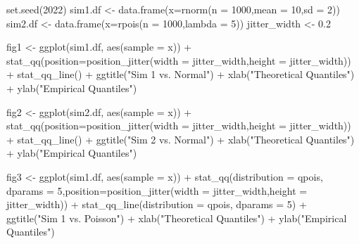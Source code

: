 \documentclass[
  11pt,
]{book}
\newenvironment{Shaded}{\begin{snugshade}}{\end{snugshade}}
\newcommand{\AttributeTok}[1]{\textcolor[rgb]{0.77,0.63,0.00}{#1}}
\newcommand{\DecValTok}[1]{\textcolor[rgb]{0.00,0.00,0.81}{#1}}
\newcommand{\FloatTok}[1]{\textcolor[rgb]{0.00,0.00,0.81}{#1}}
\newcommand{\FunctionTok}[1]{\textcolor[rgb]{0.00,0.00,0.00}{#1}}
\newcommand{\NormalTok}[1]{#1}
\newcommand{\OtherTok}[1]{\textcolor[rgb]{0.56,0.35,0.01}{#1}}
\newcommand{\SpecialCharTok}[1]{\textcolor[rgb]{0.00,0.00,0.00}{#1}}
\newcommand{\StringTok}[1]{\textcolor[rgb]{0.31,0.60,0.02}{#1}}
\theoremstyle{definition}
\theoremstyle{definition}
\theoremstyle{definition}
\theoremstyle{definition}
\theoremstyle{remark}
\begin{document}
\begin{Shaded}
\begin{Highlighting}[]
\FunctionTok{set.seed}\NormalTok{(}\DecValTok{2022}\NormalTok{)}
\NormalTok{sim1.df }\OtherTok{\textless{}{-}} \FunctionTok{data.frame}\NormalTok{(}\AttributeTok{x=}\FunctionTok{rnorm}\NormalTok{(}\AttributeTok{n =} \DecValTok{1000}\NormalTok{,}\AttributeTok{mean =} \DecValTok{10}\NormalTok{,}\AttributeTok{sd =} \DecValTok{2}\NormalTok{))}
\NormalTok{sim2.df }\OtherTok{\textless{}{-}} \FunctionTok{data.frame}\NormalTok{(}\AttributeTok{x=}\FunctionTok{rpois}\NormalTok{(}\AttributeTok{n =} \DecValTok{1000}\NormalTok{,}\AttributeTok{lambda =} \DecValTok{5}\NormalTok{))}
\NormalTok{jitter\_width }\OtherTok{\textless{}{-}} \FloatTok{0.2}

\NormalTok{fig1 }\OtherTok{\textless{}{-}} \FunctionTok{ggplot}\NormalTok{(sim1.df, }\FunctionTok{aes}\NormalTok{(}\AttributeTok{sample =}\NormalTok{ x)) }\SpecialCharTok{+}
  \FunctionTok{stat\_qq}\NormalTok{(}\AttributeTok{position=}\FunctionTok{position\_jitter}\NormalTok{(}\AttributeTok{width =}\NormalTok{ jitter\_width,}\AttributeTok{height =}\NormalTok{ jitter\_width)) }\SpecialCharTok{+}
  \FunctionTok{stat\_qq\_line}\NormalTok{() }\SpecialCharTok{+}
  \FunctionTok{ggtitle}\NormalTok{(}\StringTok{"Sim 1 vs. Normal"}\NormalTok{) }\SpecialCharTok{+}
  \FunctionTok{xlab}\NormalTok{(}\StringTok{"Theoretical Quantiles"}\NormalTok{) }\SpecialCharTok{+}
  \FunctionTok{ylab}\NormalTok{(}\StringTok{"Empirical Quantiles"}\NormalTok{)}

\NormalTok{fig2 }\OtherTok{\textless{}{-}} \FunctionTok{ggplot}\NormalTok{(sim2.df, }\FunctionTok{aes}\NormalTok{(}\AttributeTok{sample =}\NormalTok{ x)) }\SpecialCharTok{+}
  \FunctionTok{stat\_qq}\NormalTok{(}\AttributeTok{position=}\FunctionTok{position\_jitter}\NormalTok{(}\AttributeTok{width =}\NormalTok{ jitter\_width,}\AttributeTok{height =}\NormalTok{ jitter\_width)) }\SpecialCharTok{+}
  \FunctionTok{stat\_qq\_line}\NormalTok{() }\SpecialCharTok{+}
  \FunctionTok{ggtitle}\NormalTok{(}\StringTok{"Sim 2 vs. Normal"}\NormalTok{) }\SpecialCharTok{+}
  \FunctionTok{xlab}\NormalTok{(}\StringTok{"Theoretical Quantiles"}\NormalTok{) }\SpecialCharTok{+}
  \FunctionTok{ylab}\NormalTok{(}\StringTok{"Empirical Quantiles"}\NormalTok{)}

\NormalTok{fig3 }\OtherTok{\textless{}{-}} \FunctionTok{ggplot}\NormalTok{(sim1.df, }\FunctionTok{aes}\NormalTok{(}\AttributeTok{sample =}\NormalTok{ x)) }\SpecialCharTok{+}
  \FunctionTok{stat\_qq}\NormalTok{(}\AttributeTok{distribution =}\NormalTok{ qpois, }\AttributeTok{dparams =} \DecValTok{5}\NormalTok{,}\AttributeTok{position=}\FunctionTok{position\_jitter}\NormalTok{(}\AttributeTok{width =}\NormalTok{ jitter\_width,}\AttributeTok{height =}\NormalTok{ jitter\_width)) }\SpecialCharTok{+}
  \FunctionTok{stat\_qq\_line}\NormalTok{(}\AttributeTok{distribution =}\NormalTok{ qpois, }\AttributeTok{dparams =} \DecValTok{5}\NormalTok{) }\SpecialCharTok{+}
  \FunctionTok{ggtitle}\NormalTok{(}\StringTok{"Sim 1 vs. Poisson"}\NormalTok{) }\SpecialCharTok{+}
  \FunctionTok{xlab}\NormalTok{(}\StringTok{"Theoretical Quantiles"}\NormalTok{) }\SpecialCharTok{+}
  \FunctionTok{ylab}\NormalTok{(}\StringTok{"Empirical Quantiles"}\NormalTok{)}


\end{Highlighting}
\end{Shaded}
\end{document}
